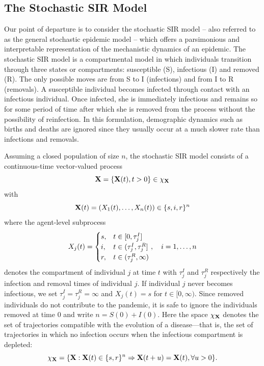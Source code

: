 \documentclass[11pt]{article}
\begin{document}
	\subsection{The Stochastic SIR Model}
	\label{sec:sir}
	
	Our point of departure is to consider the stochastic SIR model -- also referred to as the general stochastic epidemic model \cite{Bailey.1975} -- which offers a parsimonious and interpretable representation of the mechanistic dynamics of an epidemic. The stochastic SIR model is a compartmental model in which individuals transition through three states or compartments: susceptible (S), infectious (I) and removed (R). The only possible moves are from S to I (infections) and from I to R (removals). A susceptible individual becomes infected through contact with an infectious individual. Once infected, she is immediately infectious and remains so for some period of time after which she is removed from the process without the possibility of reinfection. In this formulation, demographic dynamics such as births and deaths are ignored since they usually occur at a much slower rate than infections and removals.
	
	Assuming a closed population of size $n$, the stochastic SIR model consists of a continuous-time vector-valued process
	\begin{equation}
		\label{eq:X}
		\mathbf{X} = \left\lbrace \mathbf{X}(t), t>0\right\rbrace \in \chi_{\mathbf{X}}
	\end{equation}
	with
	\begin{equation}
		\mathbf{X}(t) = \left(X_1(t), \dots, X_n(t)\right) \in \{s, i, r\}^n
	\end{equation}
	where the agent-level subprocess
	$$ X_j(t) = 
	\begin{cases}
		s, & t \in [0, \tau^I_j] \\
		i, & t \in (\tau^I_j, \tau^R_j] \\
		r, & t \in (\tau^R_j, \infty)
	\end{cases}
	,\quad i=1,\dots,n
	$$
	denotes the compartment of individual $j$ at time $t$ with $\tau^I_j$ and $\tau^R_j$ respectively the infection and removal times of individual $j$. If individual $j$ never becomes infectious, we set $\tau^I_j = \tau^R_j = \infty$ and $X_j(t) = s$ for $t \in [0, \infty)$. Since removed individuals do not contribute to the pandemic, it is safe to ignore the individuals removed at time $0$ and write $n = S(0) + I(0)$. Here the space $\chi_{\mathbf{X}}$ denotes the set of trajectories compatible with the evolution of a disease---that is, the set of trajectories in which no infection occurs when the infectious compartment is depleted:
	\begin{equation}
		\label{eq:chi}
		\chi_{\mathbf{X}} = \{\mathbf{X}:\mathbf{X}(t) \in \{s,r\}^n \Rightarrow \mathbf{X}(t+u) = \mathbf{X}(t), \forall u>0 \}.
	\end{equation}
	
\end{document}

